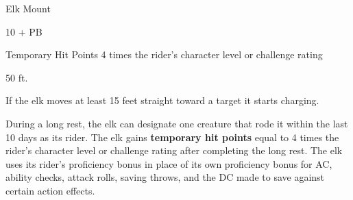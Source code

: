 \documentclass[letterpaper,twocolumn,openany,nodeprecatedcode]{dndbook}
\begin{document}
\begin{DndMonster}[float*=b,width=\textwidth + 8pt]{Elk Mount}
  \begin{multicols}{2}

    \DndMonsterLine
    \begin {CustomBasics}
      \item[\armorclassname] 10 + PB
      \item[Temporary Hit Points] 4 times the rider's character level or challenge rating
      \item[\hitpointsname]  
      \item[\speedname] 50 ft.
    \end {CustomBasics}
    \DndMonsterLine

    \DndMonsterAbilityScores[
        str = 16,
        dex = 10,
        con = 12,
        int = 2,
        wis = 10,
        cha = 6,
      ]

    \DndMonsterDetails[
        senses = {passive Perception 9},
        languages = {-},
        challenge = 1/4,
      ]

    If the elk moves at least 15 feet straight toward a target it starts charging.

    During a long rest, the elk can designate one creature that rode it within the last 10 days as its rider. The elk gains \textbf{temporary hit points} equal to 4 times the rider’s character level or challenge rating after completing the long rest. The elk uses its rider’s proficiency bonus in place of its own proficiency bonus for AC, ability checks, attack rolls, saving throws, and the DC made to save against certain action effects.


    \DndMonsterAttack[
      name=Combat Ram,
      distance=melee, %
      mod={+3 + PB},
      dmg=\DndDice{1d6 + 3},
      dmg-type=bludgeoning,
      or-dmg=\DndDice{3d6 + 3},
      or-dmg-when={if the elk is charging on the same turn.},
      extra={ If the target is a Large or smaller creature, it must succeed on a DC 11 + PB Strength saving throw or be knocked prone}
    ]


\end{multicols}
\end{DndMonster}
\end{document}
